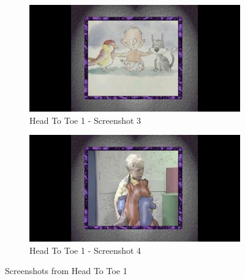 \begin{figure}[H]
    \begin{subfigure}{0.45\textwidth}
        \centering
        \includegraphics[width=\linewidth]{Games/HeadtoToe/Images/HeadToToe1Image3.png}
        \caption{Head To Toe 1 - Screenshot 3}
    \end{subfigure}
    \begin{subfigure}{0.45\textwidth}
        \centering
        \includegraphics[width=\linewidth]{Games/HeadtoToe/Images/HeadToToe1Image4.png}
        \caption{Head To Toe 1 - Screenshot 4}
    \end{subfigure}
    \caption{Screenshots from Head To Toe 1}
\end{figure}